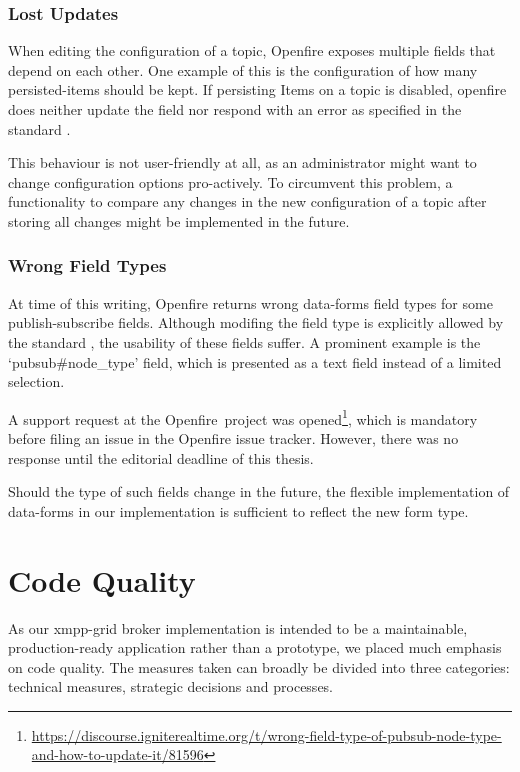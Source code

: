 \subsubsection{Lost Updates}\label{sec:lost-updates}

When editing the configuration of a \gls{topic}, Openfire exposes multiple fields that depend on each other.
One example of this is the configuration of how many \glspl{persisted-item} should be kept.
If persisting Items on a \gls{topic} is disabled, openfire does neither update the field nor respond with an error as specified in the standard \cite{xep-0060, xep-0004}.

This behaviour is not user-friendly at all, as an administrator might want to change configuration options pro-actively. To circumvent this problem, a functionality to compare any changes in the new configuration of a topic after storing all changes might be implemented in the future.

\subsubsection{Wrong Field Types}

At time of this writing, Openfire returns wrong \gls{data-forms} field types for some \gls{publish-subscribe} fields.
Although modifing the field type is explicitly allowed by the standard \cite{xep-0060}, the usability of these fields suffer.
A prominent example is the `pubsub\#node\_type' field, which is presented as a text field instead of a limited selection.

A support request at the Openfire~project was opened\footnote{\url{https://discourse.igniterealtime.org/t/wrong-field-type-of-pubsub-node-type-and-how-to-update-it/81596}},
which is mandatory before filing an issue in the Openfire issue tracker.
However, there was no response until the editorial deadline of this thesis.

Should the type of such fields change in the future, the flexible implementation of \gls{data-forms} in our implementation is sufficient to reflect the new form type.

\section{Code Quality}
As our \gls{xmpp-grid} \gls{broker} implementation is intended to be a maintainable, production-ready application rather than a prototype, we placed much emphasis on code quality.
The measures taken can broadly be divided into three categories: technical measures, strategic decisions and processes.

